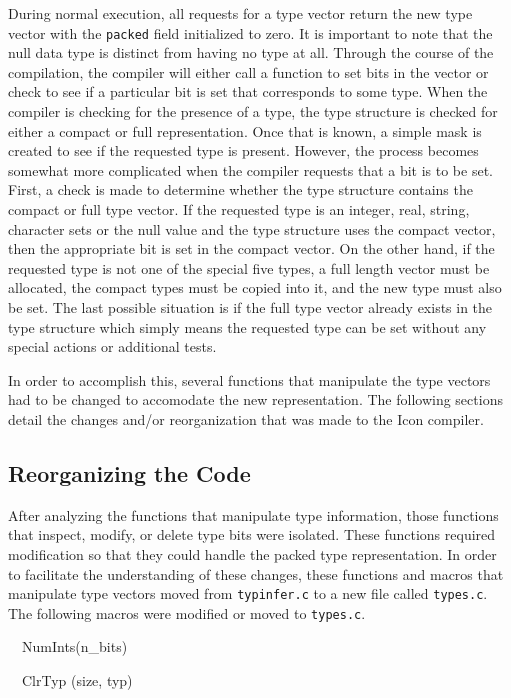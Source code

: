 During normal execution, all requests for a type vector return the new
type vector with the \texttt{packed} field initialized to zero. It
is important to note that the null data type is distinct from having
no type at all. Through the course of the compilation, the compiler
will either call a function to set bits in the vector or check to see
if a particular bit is set that corresponds to some type. When the
compiler is checking for the presence of a type, the type structure is
checked for either a compact or full representation. Once that is
known, a simple mask is created to see if the requested type is
present. However, the process becomes somewhat more complicated when
the compiler requests that a bit is to be set. First, a check is
made to determine whether the type structure contains the compact or
full type vector. If the requested type is an integer, real, string,
character sets or the null value and the type structure uses the
compact vector, then the appropriate bit is set in the compact
vector. On the other hand, if the requested type is not one of the
special five types, a full length vector must be allocated, the
compact types must be copied into it, and the new type must also be
set. The last possible situation is if the full type vector already
exists in the type structure which simply means the requested type can
be set without any special actions or additional tests.

In order to accomplish this, several functions that manipulate the
type vectors had to be changed to accomodate the new representation.
The following sections detail the changes and/or reorganization that
was made to the Icon compiler.

\subsection{Reorganizing the Code}

After analyzing the functions that manipulate type information, those
functions that inspect, modify, or delete type bits were
isolated. These functions required modification so that they could
handle the packed type representation. In order to facilitate the
understanding of these changes, these functions and macros that
manipulate type vectors moved from \texttt{typinfer.c} to a new file
called \texttt{types.c}. The following macros were modified or moved
to \texttt{types.c}.

{\ttfamily\mdseries
\ \ NumInts(n\_bits)}

{\ttfamily\mdseries
\ \ ClrTyp (size, typ)}

